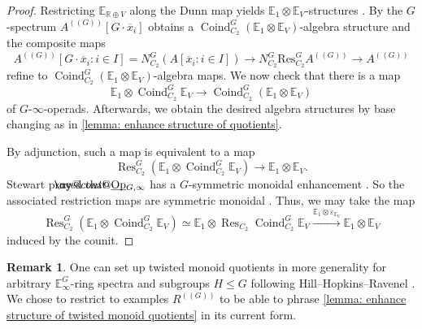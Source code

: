 \documentclass[a4paper, 10pt]{article}
\makeatletter
\newcommand{\E}{\mathbb E}  %
\newcommand{\R}{\mathbb R}
\newcommand{\Op}{\mathrm{Op}}
\newcommand{\Res}{\operatorname{Res}}
\newcommand{\Coind}{\operatorname{Coind}}
\DeclareRobustCommand{\myuline}[2][0pt]{%
  \ifmmode
    \uline{\hphantom{#2}\kern-#1}%
    \kern#1%
    \mathllap{\mathpalette\my@cont@{#2}}%
  \else
    \uline{\phantom{#2}\kern-#1}%
    \kern#1%
    \llap{\contour{white}{#2}}%
  \fi
}
\newcommand{\ul}{\myuline}
\newcommand{\ol}{\overline}
\newcommand{\my@cont@}[2]{\contour{white}{\mbox{$\m@th#1#2$}}}
\theoremstyle{definition}
\newtheorem{remark}[remark]{Remark}
\makeatother
\begin{document}
\begin{proof}
    Restricting $\E_{\R \oplus V}$ along the Dunn map yields $\E_1 \otimes \E_V$-structures \cite[Theorem III.2.2]{StewartDunn}. By \cite[Construction 2.2.5]{quinnZhu2026multiplicativeequivariantthomspectra} the $G$-spectrum $A^{( \! ( G ) \! )}[G \cdot \ol{x}_i]$ obtains a $\Coind_{C_2}^G(\E_1 \otimes \E_V)$-algebra structure and the composite maps
    \[
        A^{( \! ( G ) \! )}[G\cdot \overline{x}_i:i\in I] = N^G_{C_2}(A[\overline{x}_i:i\in I])\longrightarrow N^{G}_{C_2}\mathrm{Res}^G_{C_2}A^{( \! ( G ) \! )} \longrightarrow A^{( \! ( G ) \! )}
    \]
    refine to $\Coind_{C_2}^G(\E_1 \otimes \E_V)$-algebra maps. We now check that there is a map
    \[ \E_1 \otimes \Coind_{C_2}^G \E_V \longrightarrow \Coind_{C_2}^G(\E_1 \otimes \E_V) \]
    of $G$-$\infty$-operads. Afterwards, we obtain the desired algebra structures by base changing as in \cref{lemma: enhance structure of quotients}.

    By adjunction, such a map is equivalent to a map
    \[ \Res_{C_2}^G (\E_1 \otimes \Coind_{C_2}^G \E_{V}) \longrightarrow \E_1 \otimes \E_{V}. \]
    Stewart proved that $\ul{\Op}_{G, \infty}$ has a $G$-symmetric monoidal enhancement \cite[Corollary E']{stewart2025tensorproductsequivariantcommutative}. So the associated restriction maps are symmetric monoidal \cite[Lemma A.1.1]{quinnZhu2026multiplicativeequivariantthomspectra}. Thus, we may take the map
    \[ \Res_{C_2}^G (\E_1 \otimes \Coind_{C_2}^G \E_{V}) \simeq \E_1 \otimes \Res_{C_2} \Coind_{C_2}^G \E_{V} \xrightarrow{\E_1 \otimes \varepsilon_{\E_{V}}} \E_1 \otimes \E_{V} \]
    induced by the counit.
\end{proof}

\begin{remark}
    One can set up twisted monoid quotients in more generality for arbitrary $\E_{\infty}^G$-ring spectra and subgroups $H \leq G$ following Hill--Hopkins--Ravenel \cite{HHR16}. We chose to restrict to examples $R^{( \! ( G ) \! )}$ to be able to phrase \cref{lemma: enhance structure of twisted monoid quotients} in its current form.
\end{remark}
\end{document}
